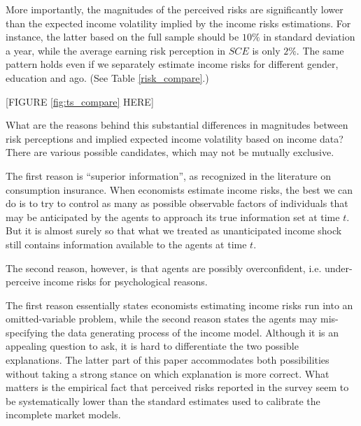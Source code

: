 More importantly, the magnitudes of the perceived risks are significantly lower than the expected income volatility implied by the income risks estimations. For instance, the latter based on the full sample should be $10\%$ in standard deviation a year, while the average earning risk perception in $SCE$ is only $2\%$. The same pattern holds even if we separately estimate income risks for different gender, education and ago. (See Table \ref{risk_compare}.)

\begin{center}
[FIGURE \ref{fig:ts_compare} HERE]
\end{center}


What are the reasons behind this substantial differences in magnitudes between risk perceptions and implied expected income volatility based on income data? There are various possible candidates, which may not be mutually exclusive. 

The first reason is ``superior information'', as recognized in the literature on consumption insurance. When economists estimate income risks, the best we can do is to try to control as many as possible observable factors of individuals that may be anticipated by the agents to approach its true information set at time $t$. But it is almost surely so that what we treated as unanticipated income shock still contains information available to the agents at time $t$. 

The second reason, however, is that agents are possibly overconfident, i.e. under-perceive income risks for psychological reasons. 

The first reason essentially states economists estimating income risks run into an omitted-variable problem, while the second reason states the agents may mis-specifying the data generating process of the income model. Although it is an appealing question to ask, it is hard to differentiate the two possible explanations. The latter part of this paper accommodates both possibilities without taking a strong stance on which explanation is more correct. What matters is the empirical fact that perceived risks reported in the survey seem to be systematically lower than the standard estimates used to calibrate the incomplete market models. 